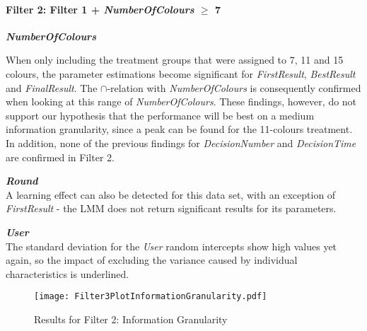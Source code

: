 \paragraph{Filter 2: Filter 1 + \textit{NumberOfColours} $\geq$ 7}
\textbf{\textit{NumberOfColours} }

When only including the treatment groups that were assigned to 7, 11 and 15 colours, the parameter estimations become significant for \textit{FirstResult}, \textit{BestResult} and \textit{FinalResult}. The \textbf{$\cap$}-relation with \textit{NumberOfColours} is consequently confirmed when looking at this range of \textit{NumberOfColours}. These findings, however, do not support our hypothesis that the performance will be best on a medium information granularity, since a peak can be found for the 11-colours treatment. In addition, none of the previous findings for \textit{DecisionNumber} and \textit{DecisionTime} are confirmed in Filter 2.

\textbf{\textit{Round} }\\
 A learning effect can also be detected for this data set, with an exception of \textit{FirstResult} - the \ac{LMM} does not return significant results for its parameters. 

\textbf{\textit{User} }\\
The standard deviation for the \textit{User} random intercepts show high values yet again, so the impact of excluding the variance caused by individual characteristics is underlined.\\

\begin{figure}[H] %
\begin{center}
\texttt{[image: Filter3PlotInformationGranularity.pdf]}    
  \caption[Results for Filter 2: Information Granularity]{Results for Filter 2: Information Granularity\footnotemark}
    \label{fig:Results for Filter 3: Information Granularity} 
\end{center}
\end{figure}

